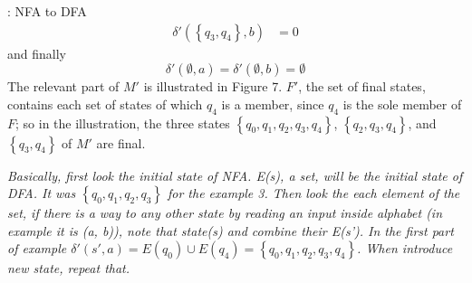 \begin{examplebreak}{: NFA to DFA}
\begin{align*}
    \delta'(\left\{ q_3, q_4 \right\}, b) &= 0
  \end{align*}
  and finally
  \begin{equation*}
    \delta'(\emptyset, a) = \delta'(\emptyset, b) = \emptyset
  \end{equation*}
  The relevant part of $M'$ is illustrated in Figure 7. $F'$, the set of final states, contains each set of states of which $q_4$ is a member, since $q_4$ is the sole member of $F$; so in the illustration, the three states $\left\{ q_0, q_1, q_2, q_3, q_4 \right\}$, $\left\{ q_2, q_3, q_4 \right\}$, and $\left\{ q_3,q_4 \right\}$ of $M'$ are final.
\end{examplebreak}

\textit{Basically, first look the initial state of NFA. E(s), a set, will be the initial state of DFA. It was $\left\{ q_0, q_1, q_2, q_3 \right\}$ for the example 3. Then look the each element of the set, if there is a way to any other state by reading an input inside alphabet (in example it is (a, b)), note that state(s) and combine their E(s'). In the first part of example $\delta'(s', a) = E(q_0) \cup E(q_4) = \left\{ q_0, q_1, q_2, q_3, q_4 \right\}$. When introduce new state, repeat that.}
